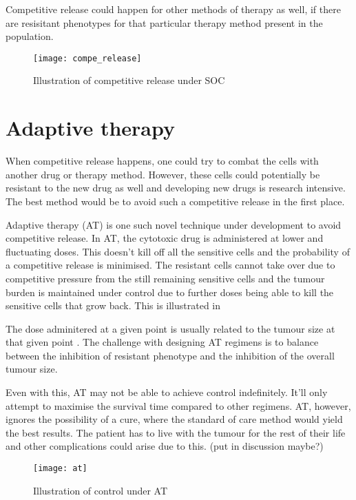 Competitive release could happen for other methods of therapy as well, if there are resisitant phenotypes for that particular therapy method present in the population.

\begin{figure}[h]
  \centering
  \texttt{[image: compe\_release]}
  \caption{Illustration of competitive release under SOC}
  \label{comperelease}
\end{figure}

\section{Adaptive therapy}
When competitive release happens, one could try to combat the cells with another drug or therapy method. However, these cells could potentially be resistant to the new drug as well and developing new drugs is research intensive. The best method would be to avoid such a competitive release in the first place.

Adaptive therapy (AT) is one such novel technique under development to avoid competitive release. In AT, the cytotoxic drug is administered at lower and fluctuating doses. This doesn't kill off all the sensitive cells and the probability of a competitive release is minimised. The resistant cells cannot take over due to competitive pressure from the still remaining sensitive cells and the tumour burden is maintained under control due to further doses being able to kill the sensitive cells that grow back. This is illustrated in

The dose adminitered at a given point is usually related to the tumour size at that given point \cite{Gatenby}. The challenge with designing AT regimens is to balance between the inhibition of resistant phenotype and the inhibition of the overall tumour size.

Even with this, AT may not be able to achieve control indefinitely. It'll only attempt to maximise the survival time compared to other regimens.
AT, however, ignores the possibility of a cure, where the standard of care method would yield the best results. The patient has to live with the tumour for the rest of their life and other complications could arise due to this.
(put in discussion maybe?)

\begin{figure}[h]
  \centering
  \texttt{[image: at]}
  \caption{Illustration of control under AT}
  \label{at}
\end{figure}

